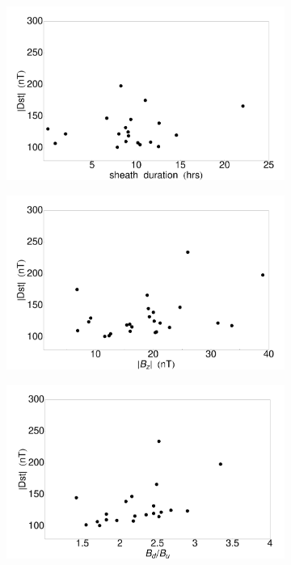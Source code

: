 \begin{figure}[!htp]
\begin{subfigure}[b]{0.45\textwidth}
	\end{subfigure}
	\hfill
	\begin{subfigure}[b]{0.45\textwidth}
		\includegraphics[width=\textwidth]{chapter2/figs/Fig_GS_sheath.pdf}
	\end{subfigure}
	\begin{subfigure}[b]{0.45\textwidth}
		\includegraphics[width=\textwidth]{chapter2/figs/Fig_GS_Bz.pdf}
	\end{subfigure}
	\hfill
	\begin{subfigure}[b]{0.45\textwidth}
		\includegraphics[width=\textwidth]{chapter2/figs/Fig_GS_Bjump.pdf}

\end{subfigure}
\end{figure}
